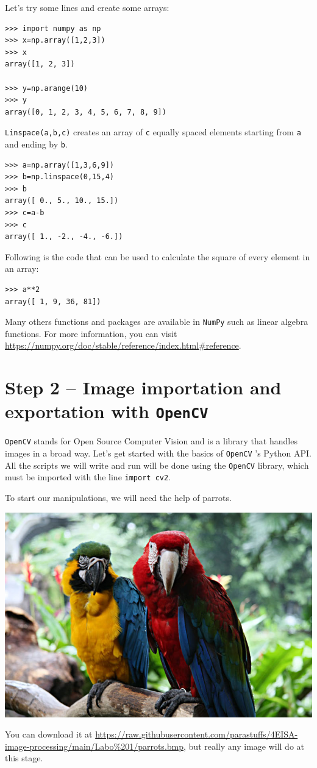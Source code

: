 \documentclass{labo}
\newcommand{\numpy}{\texttt{NumPy} }
\newcommand{\opencv}{\texttt{OpenCV} }
\begin{document}
Let’s try some lines and create some arrays:
\begin{verbatim}
>>> import numpy as np
>>> x=np.array([1,2,3])
>>> x
array([1, 2, 3])

>>> y=np.arange(10)
>>> y
array([0, 1, 2, 3, 4, 5, 6, 7, 8, 9])
\end{verbatim}

\texttt{Linspace(a,b,c)} creates an array of \texttt{c} equally spaced elements starting from \texttt{a} and ending by \texttt{b}.
\begin{verbatim}
>>> a=np.array([1,3,6,9])
>>> b=np.linspace(0,15,4)
>>> b
array([ 0., 5., 10., 15.])
>>> c=a-b
>>> c
array([ 1., -2., -4., -6.])
\end{verbatim}

Following is the code that can be used to calculate the square of every element in an array:

\begin{verbatim}
>>> a**2
array([ 1, 9, 36, 81])
\end{verbatim}

Many others functions and packages are available in \numpy such as linear algebra
functions. For more information, you can visit
\url{https://numpy.org/doc/stable/reference/index.html#reference}.




\section*{Step 2 -- Image importation and exportation with \opencv}
\opencv stands for Open Source Computer Vision and is a library that handles images in a broad way.
Let's get started with the basics of \opencv's Python API. All the scripts we will write and run
will be done using the \opencv library, which must be imported with the line \texttt{import cv2}.

To start our manipulations, we will need the help of parrots.

\begin{center}
\includegraphics[width=.45\textwidth]{parrots.jpg}
\end{center}
You can download it at \url{https://raw.githubusercontent.com/parastuffs/4EISA-image-processing/main/Labo%201/parrots.bmp}, but really any image will do at this stage.
\end{document}
